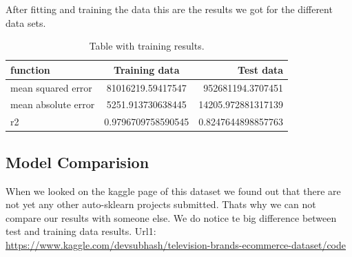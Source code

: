 After fitting and training the data this are the results we got for the different data sets.

\begin{table}[htp]
    \begin{center}
        \caption{Table with training results.}
        \label{tab:training results}
        \begin{tabular}{l|S|r} %
            \textbf{function} & \textbf{Training data} & \textbf{Test data} \\
            \hline
            mean squared error & 81016219.59417547 & 952681194.3707451 \\
            mean absolute error & 5251.913730638445 & 14205.972881317139 \\
            r2 & 0.9796709758590545 & 0.8247644898857763\\
        \end{tabular}
    \end{center}
\end{table}

\subsection{Model Comparision}
When we looked on the kaggle page of this dataset we found out that there are not yet any other auto-sklearn projects submitted. Thats why we can not compare our results with someone else. We do notice te big difference between test and training data results.
Url1: \url{https://www.kaggle.com/devsubhash/television-brands-ecommerce-dataset/code}